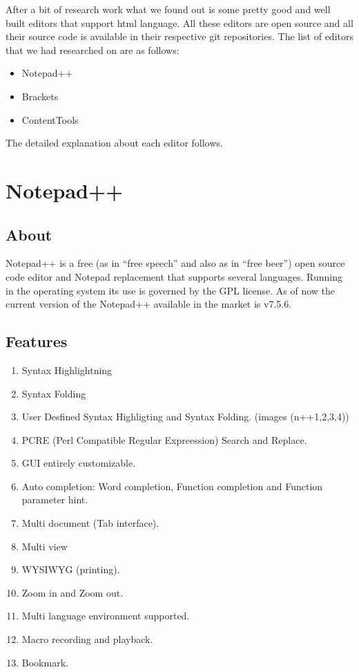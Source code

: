 After a bit of research work what we found out is some pretty good and well built editors
that support html language. All these editors are open source and all their source code is
available in their respective git repositories. The list of editors that we had researched on
are as follows: \newline
\begin{itemize}
\item Notepad++
\item Brackets
\item ContentTools
\end{itemize}
The detailed explanation about each editor follows.
\section{Notepad++}
\subsection{About}
Notepad++ is a free (as in “free speech” and also as in “free beer”) open source code editor
and Notepad replacement that supports several languages. Running in the operating system
its use is governed by the GPL license. \newline\newline
As of now the current version of the Notepad++ available in the market is v7.5.6. \newline
\subsection{Features} 
\begin{enumerate}
\item Syntax Highlightning
\item Syntax Folding
\item User Desfined Syntax Highligting and Syntax Folding. (images (n++1,2,3,4))\item PCRE (Perl Compatible Regular Expreession) Search and Replace.
\item GUI entirely customizable.
\item Auto completion: Word completion, Function completion and Function parameter hint.
\item Multi document (Tab interface).
\item Multi view
\item WYSIWYG (printing).
\item Zoom in and Zoom out.
\item Multi language environment supported.
\item Macro recording and playback.
\item Bookmark.  \newline
\end{enumerate}
